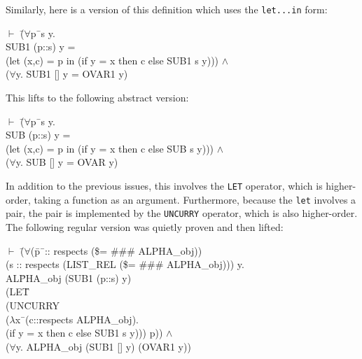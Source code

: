 \documentclass[envcountsame,runningheads]{llncs}
\begin{document}
Similarly, here is a version of this definition which uses the {\tt let...in}
form:
{\tt \begin{tabbing}
$\vdash$ \=($\forall$p\=\ s y. \\
\>\>  SUB1 (p::s) y = \\
\>\>  (let (x,c) = p in (if y = x then c else SUB1 s y))) $\wedge$ \\
\> ($\forall$y. SUB1 [] y = OVAR1 y)
\end{tabbing}}
This lifts to the following abstract version:
{\tt \begin{tabbing}
$\vdash$ \=($\forall$p\=\ s y. \\
\>\>  SUB (p::s) y = \\
\>\>  (let (x,c) = p in (if y = x then c else SUB s y))) $\wedge$ \\
\> ($\forall$y. SUB [] y = OVAR y)
\end{tabbing}}
In addition to the previous issues, this involves the {\tt LET}
operator, which is higher-order, taking a function as an argument.
Furthermore, because the {\tt let} involves a pair, the
pair is implemented by the {\tt UNCURRY} operator, which is also higher-order.
The following regular version was quietly proven and then lifted:
{\tt \begin{tabbing}
$\vdash$ \=($\forall$(\=p\=\ :: respects (\$= \#\#\# ALPHA\_obj)) \\
\>\>\> (s :: respects (LIST\_REL (\$= \#\#\# ALPHA\_obj))) y. \\
\>\>  AL\=PHA\_obj (SUB1 (p::s) y) \\
\>\>\>  (LE\=T \\
\>\>\>\>   (UN\=CURRY \\
\>\>\>\>\>    ($\lambda$x\=\ (c::respects ALPHA\_obj). \\
\>\>\>\>\>\>     (if y = x then c else SUB1 s y))) p)) $\wedge$ \\
\> ($\forall$y. ALPHA\_obj (SUB1 [] y) (OVAR1 y))
\end{tabbing}}
\end{document}
